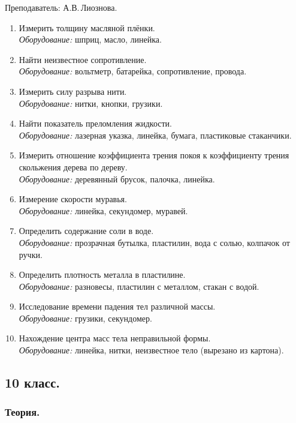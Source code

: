\documentclass[12pt,a4paper,oneside,draft]{scrartcl}
\begin{document}
\textsf{Преподаватель: А.В.\,Лиознова.}

\begin{enumerate}
\item Измерить толщину масляной плёнки. \\ \textit{Оборудование:} шприц, масло, линейка.
\item Найти неизвестное сопротивление. \\ \textit{Оборудование:} вольтметр, батарейка, сопротивление, провода.
\item Измерить силу разрыва нити. \\ \textit{Оборудование:} нитки, кнопки, грузики.
\item Найти показатель преломления жидкости. \\ \textit{Оборудование:} лазерная указка, линейка, бумага, пластиковые стаканчики.
\item Измерить отношение коэффициента трения покоя к коэффициенту
  трения скольжения дерева по дереву. \\ \textit{Оборудование:} деревянный брусок, палочка, линейка.
\item Измерение скорости муравья.  \\ \textit{Оборудование:} линейка,
  секундомер, муравей.
\item Определить содержание соли в воде. \\ \textit{Оборудование:}
  прозрачная бутылка, пластилин, вода с солью, колпачок от ручки.
\item Определить плотность металла в пластилине. \\
  \textit{Оборудование:} разновесы, пластилин с металлом, стакан с
  водой.
\item Исследование времени падения тел различной массы. \\
  \textit{Оборудование:} грузики, секундомер.
\item Нахождение центра масс тела неправильной формы. \\
  \textit{Оборудование:} линейка, нитки, неизвестное тело (вырезано из
  картона).
\end{enumerate}

\subsection{10 класс.}
\label{sec:daily_10}

\subsubsection{Теория.}
\label{sec:daily_10_th}
\end{document}
